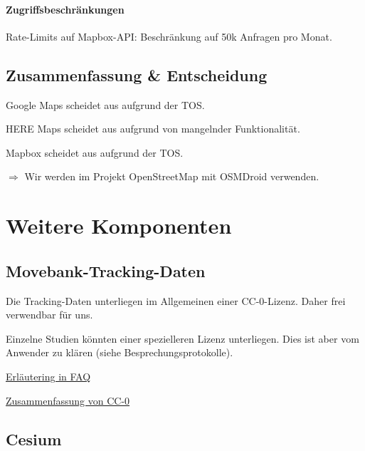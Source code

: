 \documentclass[11pt]{article} %
\begin{document}
\paragraph{Zugriffsbeschränkungen}
\begin{cptitemize} 
  	 \item Rate-Limits auf Mapbox-API: Beschränkung auf 50k Anfragen pro Monat.
 \end{cptitemize}  


 \subsection{Zusammenfassung \& Entscheidung}
 \begin{cptitemize} 
  	 \item Google Maps scheidet aus aufgrund der TOS.
  	 \item HERE Maps scheidet aus aufgrund von mangelnder Funktionalität.
  	 \item Mapbox scheidet aus aufgrund der TOS.
  	 \item[$\Rightarrow$] Wir werden im Projekt OpenStreetMap mit OSMDroid verwenden.
 \end{cptitemize} 


\section{Weitere Komponenten}


\subsection{Movebank-Tracking-Daten}
\begin{cptitemize} 
\item Die Tracking-Daten unterliegen im Allgemeinen einer CC-0-Lizenz. Daher frei verwendbar für uns.
\item Einzelne Studien könnten einer spezielleren Lizenz unterliegen. Dies ist aber vom Anwender zu klären (siehe Besprechungsprotokolle).
\item \href{https://www.movebank.org/node/2220\#licenses}{Erläutering in FAQ}
\item \href{https://creativecommons.org/publicdomain/zero/1.0/}{Zusammenfassung von CC-0}
\end{cptitemize}

\subsection{Cesium}
\end{document}
